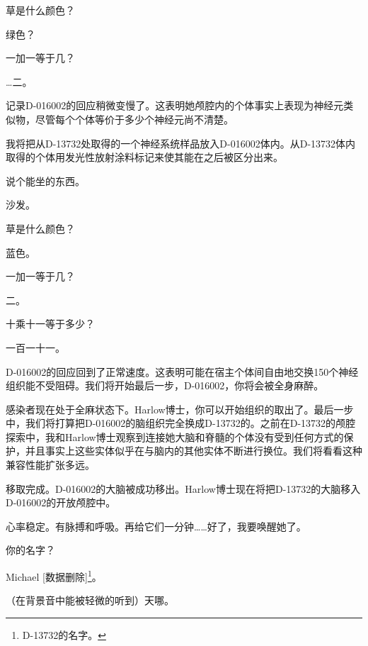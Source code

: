 \begin{scpbox}
草是什么颜色？

绿色？

一加一等于几？

…二。

记录D-016002的回应稍微变慢了。这表明她颅腔内的个体事实上表现为神经元类似物，尽管每个个体等价于多少个神经元尚不清楚。

我将把从D-13732处取得的一个神经系统样品放入D-016002体内。从D-13732体内取得的个体用发光性放射涂料标记来使其能在之后被区分出来。

说个能坐的东西。

沙发。

草是什么颜色？

蓝色。

一加一等于几？

二。

十乘十一等于多少？

一百一十一。

D-016002的回应回到了正常速度。这表明可能在宿主个体间自由地交换150个神经组织能不受阻碍。我们将开始最后一步，D-016002，你将会被全身麻醉。


感染者现在处于全麻状态下。Harlow博士，你可以开始组织的取出了。最后一步中，我们将打算把D-016002的脑组织完全换成D-13732的。之前在D-13732的颅腔探索中，我和Harlow博士观察到连接她大脑和脊髓的个体没有受到任何方式的保护，并且事实上这些实体似乎在与脑内的其他实体不断进行换位。我们将看看这种兼容性能扩张多远。


移取完成。D-016002的大脑被成功移出。Harlow博士现在将把D-13732的大脑移入D-016002的开放颅腔中。


心率稳定。有脉搏和呼吸。再给它们一分钟……好了，我要唤醒她了。


你的名字？

Michael {[}数据删除]\footnote{D-13732的名字。}。

（在背景音中能被轻微的听到）天哪。


\end{scpbox}
